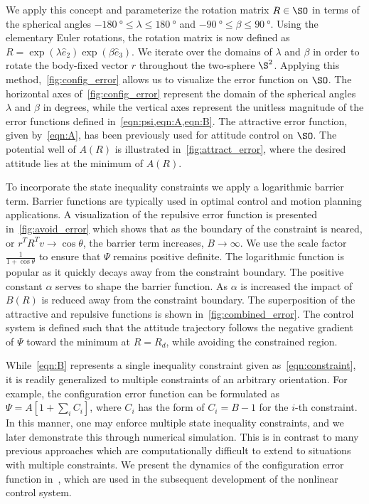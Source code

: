We apply this concept and parameterize the rotation matrix \( R \in \SO \) in terms of the spherical angles \( \SI{-180}{\degree} \leq \lambda \leq \SI{180}{\degree}  \) and \( \SI{-90}{\degree} \leq \beta \leq \SI{90}{\degree} \). 
Using the elementary Euler rotations, the rotation matrix is now defined as \( R = \exp( \lambda \hat{e}_2) \exp( \beta \hat{e}_3) \).
We iterate over the domains of \( \lambda\) and \(\beta\) in order to rotate the body-fixed vector \( r \) throughout the two-sphere \( \S^2 \).
Applying this method,~\cref{fig:config_error} allows us to visualize the error function on \( \SO \).
The horizontal axes of~\cref{fig:config_error} represent the domain of the spherical angles \( \lambda \) and \( \beta \) in degrees, while the vertical axes represent the unitless magnitude of the error functions defined in~\cref{eqn:psi,eqn:A,eqn:B}.
The attractive error function, given by~\cref{eqn:A}, has been previously used for attitude control on \(\SO\).
The potential well of \( A(R)\) is illustrated in~\cref{fig:attract_error}, where the desired attitude lies at the minimum of \( A(R) \).

To incorporate the state inequality constraints we apply a logarithmic barrier term.
Barrier functions are typically used in optimal control and motion planning applications.
A visualization of the repulsive error function is presented in~\cref{fig:avoid_error} which shows that as the boundary of the constraint is neared, or \( r^T R^T v \to \cos \theta \), the barrier term increases, \( B \to \infty\).
We use the scale factor~\(\frac{1}{1+\cos \theta} \) to ensure that \( \Psi \) remains positive definite.
The logarithmic function is popular as it quickly decays away from the constraint boundary.
The positive constant \( \alpha \) serves to shape the barrier function.
As \( \alpha \) is increased the impact of \( B(R) \) is reduced away from the constraint boundary. 
The superposition of the attractive and repulsive functions is shown in~\cref{fig:combined_error}.
The control system is defined such that the attitude trajectory follows the negative gradient of \( \Psi \) toward the minimum at \( R = R_d \), while avoiding the constrained region.

While~\cref{eqn:B} represents a single inequality constraint given as~\cref{eqn:constraint}, it is readily generalized to multiple constraints of an arbitrary orientation. 
For example, the configuration error function can be formulated as $\Psi=A[1+\sum_i C_i]$, where $C_i$ has the form of $C_i=B-1$ for the $i$-th constraint. 
In this manner, one may enforce multiple state inequality constraints, and we later demonstrate this through numerical simulation. 
This is in contrast to many previous approaches which are computationally difficult to extend to situations with multiple constraints.
We present the dynamics of the configuration error function in~, which are used in the subsequent development of the nonlinear control system.

